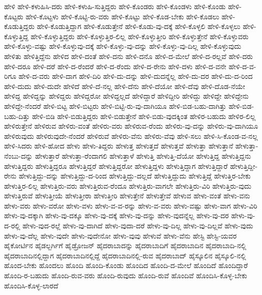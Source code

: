 {ಹೇಳಿ
ಹೇಳಿ-ಕಳುಹಿಸಿ-ದರು
ಹೇಳಿ-ಕಳುಹಿ-ಸುತ್ತಿದ್ದರು
ಹೇಳಿ-ಕೊಂಡರು
ಹೇಳಿ-ಕೊಂಡಳು
ಹೇಳಿ-ಕೊಂಡು
ಹೇಳಿ-ಕೊಟ್ಟರು
ಹೇಳಿ-ಕೊಟ್ಟಳು
ಹೇಳಿ-ಕೊಟ್ಟಿ-ರು-ವರು
ಹೇಳಿ-ಕೊಟ್ಟು
ಹೇಳಿ-ಕೊಡ-ಬೇಕು
ಹೇಳಿ-ಕೊಡಲು
ಹೇಳಿ-ಕೊಡುತ್ತಿದ್ದರು
ಹೇಳಿ-ಕೊಡುತ್ತಿದ್ದಾಗ
ಹೇಳಿ-ಕೊಡುತ್ತೇನೆ
ಹೇಳಿ-ಕೊಡು-ವು-ದಕ್ಕೆ
ಹೇಳಿ-ಕೊಳ್ಳಲಿ
ಹೇಳಿ-ಕೊಳ್ಳಲು
ಹೇಳಿ-ಕೊಳ್ಳುತ್ತಿದ್ದ
ಹೇಳಿ-ಕೊಳ್ಳುತ್ತಿದ್ದರು
ಹೇಳಿ-ಕೊಳ್ಳುತ್ತಿರ-ಲಿಲ್ಲ
ಹೇಳಿ-ಕೊಳ್ಳುತ್ತೀರಿ
ಹೇಳಿ-ಕೊಳ್ಳುತ್ತೇನೆ
ಹೇಳಿ-ಕೊಳ್ಳುವರು
ಹೇಳಿ-ಕೊಳ್ಳು-ವಷ್ಟು
ಹೇಳಿ-ಕೊಳ್ಳುವು-ದಕ್ಕೆ
ಹೇಳಿ-ಕೊಳ್ಳು-ವು-ದನ್ನು
ಹೇಳಿ-ಕೊಳ್ಳು-ವು-ದಿಲ್ಲ
ಹೇಳಿ-ಕೊಳ್ಳುವುದು
ಹೇಳಿತು
ಹೇಳಿತ್ತಿದ್ದೆನು
ಹೇಳಿದ
ಹೇಳಿ-ದಂತೆ
ಹೇಳಿ-ದನು
ಹೇಳಿ-ದನೊ
ಹೇಳಿ-ದ-ಮೇಲೆ
ಹೇಳಿ-ದ-ರಲ್ಲವೆ
ಹೇಳಿ-ದರು
ಹೇಳಿ-ದರೂ
ಹೇಳಿ-ದರೆ
ಹೇಳಿ-ದ-ರೆಂದರೆ
ಹೇಳಿ-ದ-ರೆಂದು
ಹೇಳಿ-ದ-ರೇನು
ಹೇಳಿ-ದಳು
ಹೇಳಿ-ದ-ವನೇ
ಹೇಳಿ-ದ-ವ-ರಿಗೂ
ಹೇಳಿ-ದ-ವರು
ಹೇಳಿ-ದಾಗ
ಹೇಳಿ-ದಿರಿ
ಹೇಳಿ-ದು-ದನ್ನು
ಹೇಳಿ-ದುದನ್ನೆಲ್ಲ
ಹೇಳಿ-ದು-ದರ
ಹೇಳಿ-ದು-ದ-ರಿಂದ
ಹೇಳಿ-ದುದು
ಹೇಳಿ-ದುದೇ
ಹೇಳಿದೆ
ಹೇಳಿ-ದೆ-ನಲ್ಲ
ಹೇಳಿ-ದೆನು
ಹೇಳಿ-ದೆಯೋ
ಹೇಳಿ-ದೆವು
ಹೇಳಿ-ದೊಡ-ನೆಯೇ
ಹೇಳಿದ್ದ
ಹೇಳಿದ್ದನ್ನು
ಹೇಳಿದ್ದರು
ಹೇಳಿದ್ದರೋ
ಹೇಳಿದ್ದಲ್ಲದೆ
ಹೇಳಿದ್ದಾರೆ
ಹೇಳಿದ್ದೀರಿ
ಹೇಳಿದ್ದು
ಹೇಳಿದ್ದೇ
ಹೇಳಿದ್ದೇನು
ಹೇಳಿದ್ದೇ-ನೆಂದರೆ
ಹೇಳಿ-ಬಿಟ್ಟ
ಹೇಳಿ-ಬಿಟ್ಟರು
ಹೇಳಿ-ಬಿಟ್ಟಿ-ರು-ವು-ದಾಗಿಯೂ
ಹೇಳಿ-ಬಿಡ-ಬಹು-ದಾಗಿತ್ತು
ಹೇಳಿ-ಬಿಡ-ಬಹು-ದಿತ್ತು
ಹೇಳಿ-ಬಿಡಿ
ಹೇಳಿ-ಬಿಡುತ್ತಿದ್ದರು
ಹೇಳಿ-ಬಿಡುತ್ತೇನೆ
ಹೇಳಿ-ಬಿಡು-ವುದಕ್ಕಿಂತ
ಹೇಳಿರ-ಬಹುದು
ಹೇಳಿರ-ಲಿಲ್ಲ
ಹೇಳಿರುತ್ತೇನೆ
ಹೇಳಿರುವ
ಹೇಳಿರು-ವಂತೆ
ಹೇಳಿರು-ವರು
ಹೇಳಿರುವ-ರೆಂದು
ಹೇಳಿರು-ವು-ದನ್ನು
ಹೇಳಿರು-ವು-ದಾಗಿಯೂ
ಹೇಳಿರುವುದು
ಹೇಳಿರುವುದೇ-ನೆಂದರೆ
ಹೇಳಿರುವೆ
ಹೇಳಿರು-ವೆನು
ಹೇಳಿರು-ವೆವು
ಹೇಳಿ-ಸಲು
ಹೇಳಿ-ಸಿ-ಕೊಂಡ-ವ-ನಲ್ಲ
ಹೇಳಿ-ಸಿದರು
ಹೇಳಿ-ಹೋದ
ಹೇಳು
ಹೇಳು-ತಿದ್ದರು
ಹೇಳುತ್ತ
ಹೇಳುತ್ತದೆ
ಹೇಳುತ್ತವೆ
ಹೇಳುತ್ತಾ
ಹೇಳುತ್ತಾನೆ
ಹೇಳುತ್ತಾ-ನೆಂಬು-ದನ್ನು
ಹೇಳುತ್ತಾರೆ
ಹೇಳುತ್ತಾ-ರೆಂದಾಗಲಿ
ಹೇಳುತ್ತಾಳೆ
ಹೇಳುತ್ತಿ
ಹೇಳುತ್ತಿ-ದೆಯೋ
ಹೇಳುತ್ತಿದ್ದ
ಹೇಳುತ್ತಿದ್ದನು
ಹೇಳುತ್ತಿದ್ದರು
ಹೇಳುತ್ತಿದ್ದರೂ
ಹೇಳುತ್ತಿದ್ದರೆ
ಹೇಳುತ್ತಿದ್ದರೋ
ಹೇಳುತ್ತಿದ್ದಳು
ಹೇಳುತ್ತಿದ್ದಾಗ
ಹೇಳುತ್ತಿದ್ದಾರೆ
ಹೇಳುತ್ತಿದ್ದೀ-ರೇನು
ಹೇಳುತ್ತಿದ್ದು-ದನ್ನು
ಹೇಳುತ್ತಿದ್ದು-ದ-ರಿಂದ
ಹೇಳುತ್ತಿದ್ದು-ದಲ್ಲದೆ
ಹೇಳುತ್ತಿದ್ದುದು
ಹೇಳುತ್ತಿದ್ದೆ
ಹೇಳುತ್ತಿರ-ಬೇಕು
ಹೇಳುತ್ತಿರ-ಲಿಲ್ಲ
ಹೇಳುತ್ತಿರು-ವರು
ಹೇಳುತ್ತಿರುವ-ರೆಂದೂ
ಹೇಳುತ್ತಿರು-ವಾಗಲೇ
ಹೇಳುತ್ತಿರು-ವಿರಿ
ಹೇಳುತ್ತಿರು-ವುದು
ಹೇಳುತ್ತಿರುವೆ
ಹೇಳುತ್ತೀಯೆ
ಹೇಳುತ್ತೀರಾ
ಹೇಳುತ್ತೀರಿ
ಹೇಳುತ್ತೇನೆ
ಹೇಳುತ್ತೇವೆ
ಹೇಳುವ
ಹೇಳು-ವಂತೆ
ಹೇಳು-ವನು
ಹೇಳು-ವರು
ಹೇಳು-ವರೋ
ಹೇಳು-ವಳು
ಹೇಳು-ವ-ವ-ರನ್ನು
ಹೇಳು-ವ-ವರು
ಹೇಳು-ವಷ್ಟು
ಹೇಳು-ವಾಗ
ಹೇಳು-ವಿರಿ
ಹೇಳು-ವು-ದಕ್ಕಾಗಿ
ಹೇಳು-ವು-ದಕ್ಕೂ
ಹೇಳು-ವು-ದಕ್ಕೆ
ಹೇಳು-ವು-ದನ್ನು
ಹೇಳು-ವುದನ್ನೆಲ್ಲ
ಹೇಳು-ವು-ದರ
ಹೇಳು-ವು-ದ-ರಲ್ಲಿ
ಹೇಳು-ವುದ-ರಲ್ಲೆ
ಹೇಳು-ವು-ದಾಗಿದೆ
ಹೇಳು-ವುದಾ-ದರೆ
ಹೇಳು-ವು-ದಿಲ್ಲ
ಹೇಳು-ವು-ದಿಲ್ಲವೆ
ಹೇಳು-ವುದು
ಹೇಳು-ವು-ದೆಲ್ಲ
ಹೇಳು-ವುದೇ
ಹೇಳು-ವುದೇನೋ
ಹೇಳು-ವುವು
ಹೇಳುವೆ
ಹೇಳು-ವೆನು
ಹೇಸ್ಟಿ
ಹೇಸ್ಟಿ-ಯವರ
ಹೈಕೋರ್ಟಿನ
ಹೈಡಲ್ಬರ್ಗಿಗೆ
ಹೈಡ್ರೋಜನ್
ಹೈದರಾಬಾದನ್ನು
ಹೈದರಾಬಾದಿಗೆ
ಹೈದರಾಬಾದಿನ
ಹೈದರಾಬಾದಿ-ನಲ್ಲಿ
ಹೈದರಾಬಾದಿನಲ್ಲಿದ್ದಾಗ
ಹೈದರಾಬಾದಿನಲ್ಲಿದ್ದೆ
ಹೈದರಾಬಾದಿನಲ್ಲಿ-ರುವ
ಹೈದರಾಬಾದ್
ಹೈಸ್ಕೂಲಿನ
ಹೈಸ್ಕೂಲಿ-ನಲ್ಲಿ
ಹೊಂದ-ಬೇಕು
ಹೊಂದಲು
ಹೊಂದಿ
ಹೊಂದಿ-ಕೊಂಡು
ಹೊಂದಿದ
ಹೊಂದಿ-ದ-ಮೇಲೆ
ಹೊಂದಿದೆ
ಹೊಂದಿದ್ದಾರೆ
ಹೊಂದಿ-ರ-ಬಹುದು
ಹೊಂದಿ-ರುವ-ವರು
ಹೊಂದಿ-ರುವುದು
ಹೊಂದಿ-ರುವೆ
ಹೊಂದಿವೆ
ಹೊಂದಿಸಿ-ಕೊಳ್ಳ-ಬೇಕು
ಹೊಂದಿಸಿ-ಕೊಳ್ಳ-ಲಾರದೆ
}
